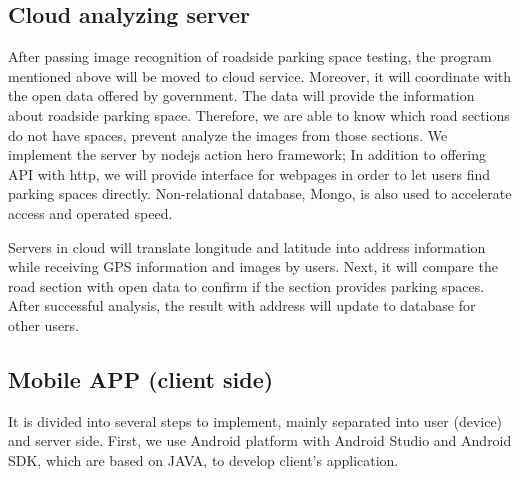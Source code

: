 \documentclass[runningheads,a4paper]{llncs}
\begin{document}
\subsection{Cloud analyzing server}

After passing image recognition of roadside parking space testing, the
program mentioned above will be moved to cloud service. Moreover, it will
coordinate with the open data offered by government. The data will
provide the information about roadside parking space. Therefore, we are
able to know which road sections do not have spaces, prevent analyze the
images from those sections. We implement the server by nodejs action
hero framework; In addition to offering API with http, we will provide
interface for webpages in order to let users find parking spaces
directly. Non-relational database, Mongo, is also used to accelerate
access and operated speed. 

Servers in cloud will translate longitude and latitude into address
information while receiving GPS information and images by users. Next,
it will compare the road section with open data to confirm if the
section provides parking spaces. After successful analysis, the result
with address will update to database for other users.

\subsection{Mobile APP (client side)}

It is divided into several steps to implement, mainly separated into
user (device) and server side. First, we use Android platform with
Android Studio and Android SDK, which are based on JAVA, to develop
client's application.
\end{document}
